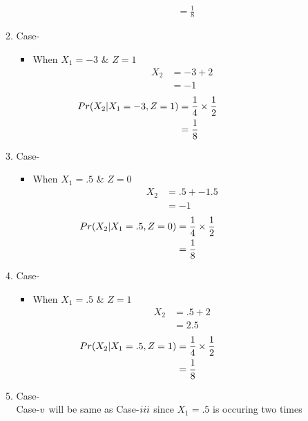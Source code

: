 \documentclass[11pt,a4paper,twocolumn]{article}
\begin{document}
\begin{enumerate}
\begin{enumerate}
\begin{itemize}
\begin{align*}
        &=\frac{1}{8}
    \end{align*}
\end{itemize}
        \item Case-
      \begin{itemize}
      \item When $X_{1}=-3$ \& $Z=1$
    \begin{align*}
        X_{2}&=-3+2\\
        &=-1
    \end{align*}
    \begin{align*}
    \hspace{-2.5cm}
        Pr(X_{2}|X_{1}=-3,Z=1)&=\frac{1}{4}\times\frac{1}{2}\\
        &=\frac{1}{8}
    \end{align*}
    \end{itemize}
        \item Case-
        \begin{itemize}
          \item When $X_{1}=.5$ \& $Z=0$
    \begin{align*}
        X_{2}&=.5+-1.5\\
        &=-1
    \end{align*}
    \begin{align*}
    \hspace{-2.5cm}
        Pr(X_{2}|X_{1}=.5,Z=0)&=\frac{1}{4}\times\frac{1}{2}\\
        &=\frac{1}{8}
    \end{align*}
        \end{itemize}
        \item Case-
    \begin{itemize}
        \item When $X_{1}=.5$ \& $Z=1$
    \begin{align*}
        X_{2}&=.5+2\\
        &=2.5
    \end{align*}
    \begin{align*}
    \hspace{-2.5cm}
        Pr(X_{2}|X_{1}=.5,Z=1)&=\frac{1}{4}\times\frac{1}{2}\\
        &=\frac{1}{8}
    \end{align*}
    \end{itemize}
    \item Case-\\
    Case-$\romannumeral5$ will be same as Case-$\romannumeral3$ since $X_{1}=.5$ is occuring two times\\

\end{enumerate}
\end{enumerate}
\end{document}
